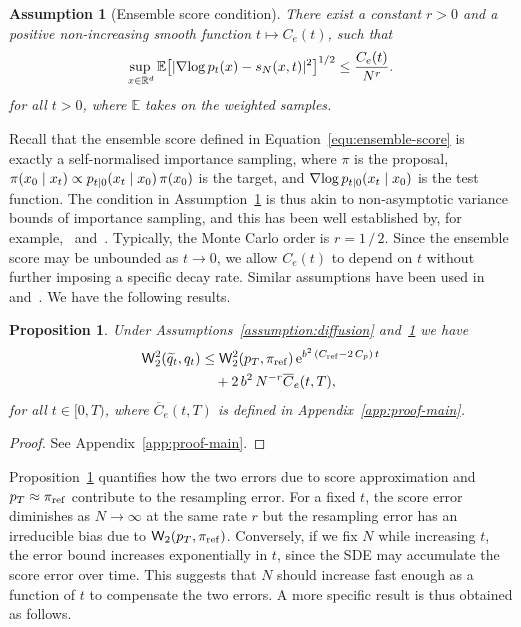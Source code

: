 \documentclass{article}
\newtheorem{assumption}{Assumption}
\newtheorem{proposition}{Proposition}
\begin{document}
\begin{assumption}[Ensemble score condition] There exist a constant $r>0$ and a positive non-increasing smooth function $t\mapsto C_{e}(t)$, such that
    \label{assumption-score-approx}
    \begin{equation*}
        \operatorname*{sup\,}_{x\in\mathbb{R}^d} \operatorname{\mathbb{E}} \bigl[ \lvert\operatorname{\nabla\!}\log p_t(x) - s_N(x, t)\rvert^2 \bigr]^{1/2} \leq \frac{C_e(t)}{N^r}.
    \end{equation*}
    for all $t>0$, where $\mathbb{E}$ takes on the weighted samples.
\end{assumption}
Recall that the ensemble score defined in Equation~\eqref{equ:ensemble-score} is exactly a self-normalised importance sampling, where $\pi$ is the proposal, $\pi(x_0 {\;|\;} x_t) \propto p_{t|0}(x_t {\;|\;} x_0) \, \pi(x_0)$ is the target, and $\operatorname{\nabla\!}\log p_{t|0}(x_t {\;|\;} x_0)$ is the test function. 
The condition in Assumption~\ref{assumption-score-approx} is thus akin to non-asymptotic variance bounds of importance sampling, and this has been well established by, for example,~\citet{Agapiou2017} and~\citet[][Thm. 8.5]{ChopinBook2020}. 
Typically, the Monte Carlo order is $r = 1\,/\,2$. 
Since the ensemble score may be unbounded as $t\to0$, we allow $C_e(t)$ to depend on $t$ without further imposing a specific decay rate. 
Similar assumptions have been used in~\citet[][A3]{DeBortoli2022convergence} and~\citet{DeBortoli2025convergence}. 
We have the following results. 

\begin{proposition}
    \label{proposition:main}
    Under Assumptions~\ref{assumption:diffusion} and~\ref{assumption-score-approx} we have 
    \begin{equation*}
        \begin{split}
            \mathsf{W}_2^2(\widetilde{q}_t, q_t) &\leq \mathsf{W}_2^2(p_T, \pi_{\mathrm{ref}}) \, \mathrm{e}^{b^2 \,(C_{\mathrm{ref}} - 2\, C_p) \, t}  \\
            &\quad+ 2 \, b^2 \, N^{-r} \overline{C}_e(t, T),
        \end{split}
    \end{equation*}
    for all $t\in[0, T)$, where $\overline{C}_e(t, T)$ is defined in Appendix~\ref{app:proof-main}.
\end{proposition}
%
\begin{proof}
    See Appendix~\ref{app:proof-main}.
\end{proof}
%
Proposition~\ref{proposition:main} quantifies how the two errors due to score approximation and $p_T \approx \pi_{\mathrm{ref}}$ contribute to the resampling error. 
For a fixed $t$, the score error diminishes as $N\to\infty$ at the same rate $r$ but the resampling error has an irreducible bias due to $\mathsf{W}_2(p_T, \pi_{\mathrm{ref}})$.
Conversely, if we fix $N$ while increasing $t$, the error bound increases exponentially in $t$, since the SDE may accumulate the score error over time. 
This suggests that $N$ should increase fast enough as a function of $t$ to compensate the two errors. 
A more specific result is thus obtained as follows.
\end{document}
